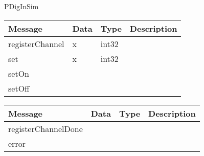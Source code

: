  {PDigInSim}

\begin{tabular}[ht]{|l|l|l|p{8cm}|}
\hline
Message & Data & Type & Description\\
\hline
registerChannel &  x  &  int32  & \\
\hline
set &  x  &  int32  & \\
\hline
setOn &  &  & \\
\hline
setOff &  &  & \\
\hline
\end{tabular}
\begin{tabular}[ht]{|l|l|l|p{8cm}|}
\hline
Message & Data & Type & Description\\
\hline
registerChannelDone &  &  & \\
\hline
error &  &  & \\
\hline
\end{tabular}
